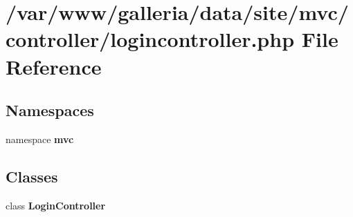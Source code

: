 \section{/var/www/galleria/data/site/mvc/controller/logincontroller.php File Reference}
\label{logincontroller_8php}
\subsection*{Namespaces}
\begin{CompactItemize}
\item 
namespace {\bf mvc}
\end{CompactItemize}
\subsection*{Classes}
\begin{CompactItemize}
\item 
class {\bf LoginController}
\end{CompactItemize}
